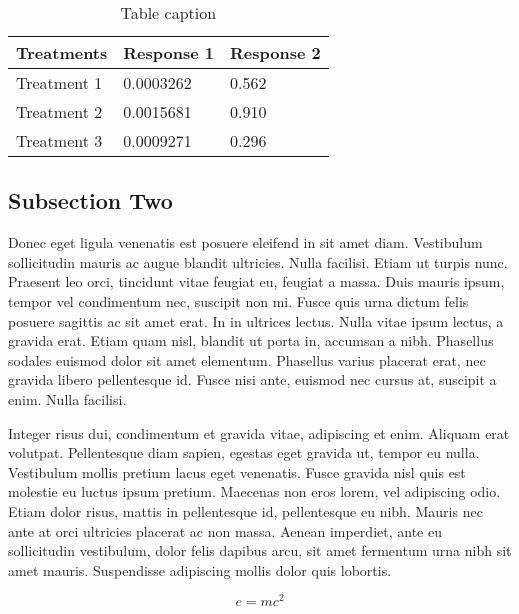 \documentclass[preprint,12pt,a4paper]{elsarticle}
\begin{document}
\begin{table}[h]
\centering
\begin{tabular}{l l l}
\hline
\textbf{Treatments} & \textbf{Response 1} & \textbf{Response 2}\\
\hline
Treatment 1 & 0.0003262 & 0.562 \\
Treatment 2 & 0.0015681 & 0.910 \\
Treatment 3 & 0.0009271 & 0.296 \\
\hline
\end{tabular}
\caption{Table caption}
\end{table}

\subsection{Subsection Two}

Donec eget ligula venenatis est posuere eleifend in sit amet diam. Vestibulum
sollicitudin mauris ac augue blandit ultricies. Nulla facilisi. Etiam ut turpis
nunc. Praesent leo orci, tincidunt vitae feugiat eu, feugiat a massa. Duis
mauris ipsum, tempor vel condimentum nec, suscipit non mi. Fusce quis urna
dictum felis posuere sagittis ac sit amet erat. In in ultrices lectus. Nulla
vitae ipsum lectus, a gravida erat. Etiam quam nisl, blandit ut porta in,
accumsan a nibh. Phasellus sodales euismod dolor sit amet elementum. Phasellus
varius placerat erat, nec gravida libero pellentesque id. Fusce nisi ante,
euismod nec cursus at, suscipit a enim. Nulla facilisi.


Integer risus dui, condimentum et gravida vitae, adipiscing et enim. Aliquam
erat volutpat. Pellentesque diam sapien, egestas eget gravida ut, tempor eu
nulla. Vestibulum mollis pretium lacus eget venenatis. Fusce gravida nisl quis
est molestie eu luctus ipsum pretium. Maecenas non eros lorem, vel adipiscing
odio. Etiam dolor risus, mattis in pellentesque id, pellentesque eu nibh.
Mauris nec ante at orci ultricies placerat ac non massa. Aenean imperdiet, ante
eu sollicitudin vestibulum, dolor felis dapibus arcu, sit amet fermentum urna
nibh sit amet mauris. Suspendisse adipiscing mollis dolor quis lobortis.

\begin{equation}
\label{eq:emc}
e = mc^2
\end{equation}
\end{document}
